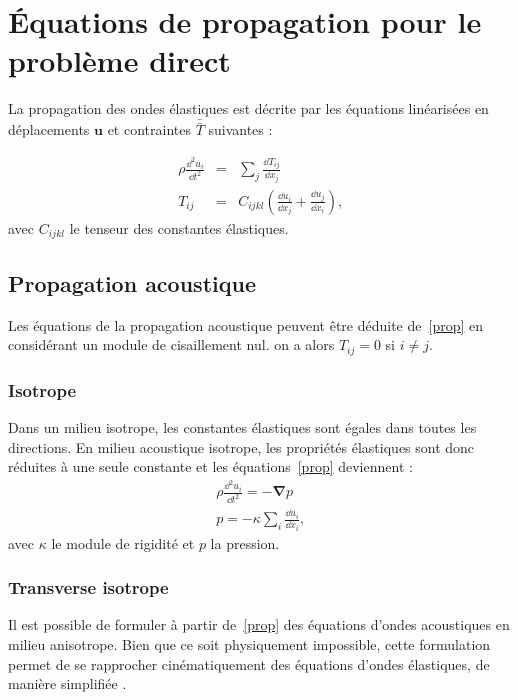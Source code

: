 \section{Équations de propagation pour le problème direct}

La propagation des ondes élastiques est décrite par les équations linéarisées en déplacements $\bm{u}$ et contraintes $\bar{\bar T}$ suivantes \citep{mat_ac} : 

\begin{eqnarray}
	\rho \frac{\dd^2 u_{i}}{\dd t^2} &=& \displaystyle\sum_{j}\frac{\dd T_{ij}}{\dd x_{j}}\\
	T_{ij}&=&C_{ijkl}\left( \frac{\dd u_{i}}{\dd x_{j}} + \frac{\dd u_{j}}{\dd x_{i}}\right)\text{,}
	\label{prop}
\end{eqnarray}
avec $C_{ijkl}$ le tenseur des constantes élastiques.

\subsection{Propagation acoustique}
Les équations de la propagation acoustique peuvent être déduite de~\ref{prop} en considérant un module de cisaillement nul. on a alors $T_{ij}=0$ si $i\neq j$.

\subsubsection{Isotrope}
Dans un milieu isotrope, les constantes élastiques sont égales dans toutes les directions. En milieu acoustique isotrope, les propriétés élastiques sont donc réduites à une seule constante et les équations~\ref{prop} deviennent : 
\begin{eqnarray}
	\rho \frac{\dd^2 u_{i}}{\dd t^2} = -\bm{\nabla} p\\
	p=-\kappa \displaystyle\sum_{i} \frac{\dd u_{i}}{\dd x_{i}}\text{,}
\end{eqnarray}
avec $\kappa$ le module de rigidité et $p$ la pression.

\subsubsection{Transverse isotrope}

Il est possible de formuler à partir de~\ref{prop} des équations d'ondes acoustiques en milieu anisotrope. Bien que ce soit physiquement impossible, cette formulation permet de se rapprocher cinématiquement des équations d'ondes élastiques, de manière simplifiée \citep{alkhalifah}.

